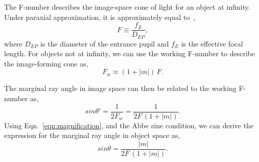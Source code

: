 The F-number describes the image-space cone of light for an object at infinity.  Under paraxial approximation, it is approximately equal to~\citep{greivenkampfieldguide},
%
\begin{equation}
F \equiv \frac{f_E}{D_{EP}},
\end{equation}
%
where $D_{EP}$ is the diameter of the entrance pupil and $f_E$ is the effective focal length.  For objects not at infinity, we can use the working F-number to describe the image-forming cone as,
%
\begin{equation}
F_{w} \approx (1 + \lvert m \rvert) \, F.
\end{equation}

The marginal ray angle in image space can then be related to the working F-number as,
%
\begin{equation}
sin \theta' = \frac{1}{2 F_{w}} = \frac{1}{2 F \, (1+ \lvert m \rvert)}.
\end{equation}
%
Using Eqn.~\ref{eqn:magnification}, and the Abbe sine condition, we can derive the expression for the marginal ray angle in object space as,
%
\begin{equation}
sin \theta = \frac{ \lvert m \rvert }{2 F \, (1+ \lvert m \rvert )}.
\label{eqn:marginal_ray_angle}
\end{equation}

